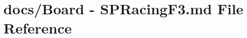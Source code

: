 \hypertarget{Board_01-_01SPRacingF3_8md}{\section{docs/\+Board -\/ S\+P\+Racing\+F3.\+md File Reference}
\label{Board_01-_01SPRacingF3_8md}
}
